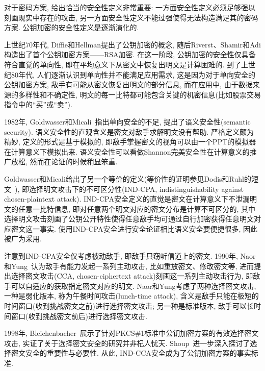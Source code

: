\begin{note}
对于密码方案, 给出恰当的安全性定义非常重要: 一方面安全性定义必须足够强以刻画现实中存在的攻击, 
另一方面安全性定义不能过强使得无法构造满足其的密码方案. 公钥加密的安全性定义是逐渐演化的. 

上世纪70年代, Diffie和Hellman提出了公钥加密的概念, 随后Riverst、Shamir和Adi构造出了首个公钥加密方案——RSA加密. 
在这一阶段, 公钥加密的安全性仅具备符合直觉的单向性, 即在平均意义下从密文中恢复出明文是计算困难的. 
到了上世纪80年代, 人们逐渐认识到单向性并不能满足应用需求, 这是因为对于单向安全的公钥加密方案, 
敌手有可能从密文恢复出明文的部分信息, 而在应用中, 由于数据来源的多样性和不确定性, 
明文的每一比特都可能包含关键的机密信息(比如股票交易指令中的``买''或``卖'').  

1982年, Goldwasser和Micali~\cite{GM-STOC-1982}指出单向安全的不足, 提出了语义安全性(semantic security). 
语义安全性的直观含义是密文对敌手求解明文没有帮助. 严格定义颇为精妙, 定义的形式是基于模拟的, 
即敌手掌握密文的视角可以由一个PPT的模拟器在计算意义下模拟出来. 
语义安全性可以看做Shannon完美安全性在计算意义的推广放松, 然而在论证的时候稍显笨重. 

Goldwasser和Micali给出了另一个等价的定义(等价性的证明参见Dodis和Ruhl的短文~\cite{DR-Web-1999}), 
即选择明文攻击下的不可区分性(IND-CPA, indistinguishability against chosen-plaintext attack). 
IND-CPA安全定义的直觉是密文在计算意义下不泄漏明文的任意一比特信息, 即对任意两个明文对应的密文分布是计算不可区分的, 
其中选择明文攻击刻画了公钥公开特性使得任意敌手均可通过自行加密获得任意明文对应密文这一事实. 
使用IND-CPA安全进行安全论证相比语义安全要便捷很多, 因此被广为采用. 

注意到IND-CPA安全仅考虑被动敌手, 即敌手只窃听信道上的密文. 
1990年, Naor和Yung~\cite{NY-STOC-1990}认为敌手有能力发起一系列主动攻击, 比如重放密文、修改密文等, 
进而提出选择密文攻击(CCA, chosen-ciphertext attack)刻画这一系列主动攻击行为, 即敌手可以自适应的获取指定密文对应的明文. 
Naor和Yung考虑了两种选择密文攻击, 一种是弱化版本, 
称为午餐时间攻击(lunch-time attack), 含义是敌手只能在极短的时间窗口(收到挑战密文之前)进行选择密文攻击; 
另一种是标准版本, 敌手可以长时间窗口(收到挑战密文前后)进行选择密文攻击. 

1998年, Bleichenbacher~\cite{Bleichenbacher-CRYPTO-1998}展示了针对PKCS\#1标准中公钥加密方案的有效选择密文攻击, 实证了关于选择密文安全的研究并非杞人忧天. 
Shoup~\cite{Shoup-TechReport-1998}进一步深入探讨了选择密文安全的重要性与必要性. 
从此, IND-CCA安全成为了公钥加密方案的事实标准.        
\end{note}


